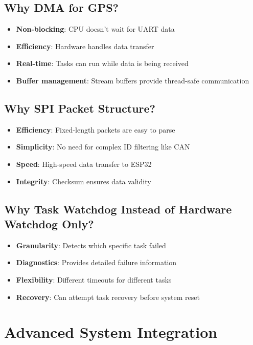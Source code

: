 \documentclass[11pt,a4paper]{article}
\begin{document}
\subsection{Why DMA for GPS?}
\begin{itemize}
    \item \textbf{Non-blocking}: CPU doesn't wait for UART data
    \item \textbf{Efficiency}: Hardware handles data transfer
    \item \textbf{Real-time}: Tasks can run while data is being received
    \item \textbf{Buffer management}: Stream buffers provide thread-safe communication
\end{itemize}

\subsection{Why SPI Packet Structure?}
\begin{itemize}
    \item \textbf{Efficiency}: Fixed-length packets are easy to parse
    \item \textbf{Simplicity}: No need for complex ID filtering like CAN
    \item \textbf{Speed}: High-speed data transfer to ESP32
    \item \textbf{Integrity}: Checksum ensures data validity
\end{itemize}

\subsection{Why Task Watchdog Instead of Hardware Watchdog Only?}
\begin{itemize}
    \item \textbf{Granularity}: Detects which specific task failed
    \item \textbf{Diagnostics}: Provides detailed failure information
    \item \textbf{Flexibility}: Different timeouts for different tasks
    \item \textbf{Recovery}: Can attempt task recovery before system reset
\end{itemize}

\section{Advanced System Integration}
\end{document}
